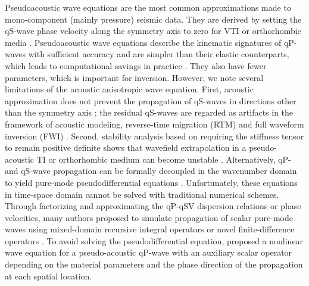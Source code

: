 Pseudoacoustic wave equations are the most common approximations made
to mono-component (mainly pressure) seismic data. They are derived by setting the
qS-wave phase velocity along the symmetry axis to zero  
for VTI or orthorhombic media \cite[]{alkhalifah:2000,
alkhalifah:2003,duveneck:2011}.
Pseudoacoustic wave equations describe the kinematic signatures of qP-waves
   with sufficient accuracy and are simpler than their elastic
   counterparts, which leads to computational savings in practice
   \cite[]{zhou:2006eage,fletcher:2009,zhang.zhang:2011}.
They also have fewer parameters, which is important for inversion.
However, we note several limitations of the acoustic anisotropic wave equation.
First, acoustic approximation does not prevent the propagation of qS-waves in directions other than
   the symmetry axis \cite[]{grechka:2004,zhang:2005}; the residual qS-waves are
   regarded as artifacts in the framework of acoustic modeling, reverse-time migration
   (RTM) and full waveform inversion (FWI)
   \cite[]{alkhalifah:2000,zhang:2009,operto:2009}.
Second, stability analysis based on requiring the stiffness tensor to remain positive definite
\cite[]{helbig:1994} shows that wavefield extrapolation in a pseudo-acoustic TI or orthorhombic medium
can become unstable \cite[]{alkhalifah:2000,grechka:2004,fowler.king:2011}.
Alternatively, qP- and qS-wave propagation can be formally decoupled in the wavenumber domain
to yield pure-mode pseudodifferential equations \cite[]{liu:2009,du:2014}.
Unfortunately, these equations in time-space domain cannot be solved with traditional numerical schemes.
Through factorizing and approximating the qP-qSV dispersion relations or phase velocities,
many authors proposed to simulate propagation of scalar pure-mode waves
using mixed-domain recursive integral operators
\cite[]{etgen:2009,liu:2009,zhang.zhang:2009,crawley:2010,
fowler:2010,chu:2011,pestana:2011,zhan:2012,fomel:2013}
or novel finite-difference operators \cite[]{song:2013}.
To avoid solving the pseudodifferential equation, \cite{xu.zhou:2014}
proposed a nonlinear wave equation for a pseudo-acoustic qP-wave with an auxiliary
scalar operator depending on the material parameters and the phase direction of the
propagation at each spatial location.


